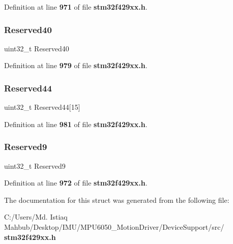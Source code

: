 Definition at line \textbf{ 971} of file \textbf{ stm32f429xx.\+h}.

\mbox{\label{structUSB__OTG__DeviceTypeDef_a9e0c029846e94bf08ac8edb35b30ecb2}} 
\subsubsection{Reserved40}
{\footnotesize\ttfamily uint32\+\_\+t Reserved40}



Definition at line \textbf{ 979} of file \textbf{ stm32f429xx.\+h}.

\mbox{\label{structUSB__OTG__DeviceTypeDef_a8b1e044bd34b12074334270cfd18c931}} 
\subsubsection{Reserved44}
{\footnotesize\ttfamily uint32\+\_\+t Reserved44[15]}



Definition at line \textbf{ 981} of file \textbf{ stm32f429xx.\+h}.

\mbox{\label{structUSB__OTG__DeviceTypeDef_a5dc05e38e6d591cd88f820b7a0b3f727}} 
\subsubsection{Reserved9}
{\footnotesize\ttfamily uint32\+\_\+t Reserved9}



Definition at line \textbf{ 972} of file \textbf{ stm32f429xx.\+h}.



The documentation for this struct was generated from the following file\+:\begin{DoxyCompactItemize}
\item 
C\+:/\+Users/\+Md. Istiaq Mahbub/\+Desktop/\+I\+M\+U/\+M\+P\+U6050\+\_\+\+Motion\+Driver/\+Device\+Support/src/\textbf{ stm32f429xx.\+h}\end{DoxyCompactItemize}
